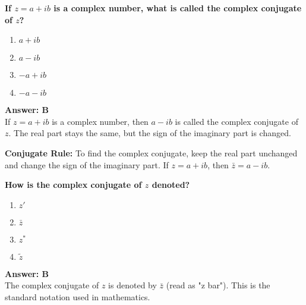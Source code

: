 \documentclass[12pt,a4paper]{article}
\begin{document}
\newpage
\begin{questiontitle}[MCQ 30]
\textbf{If \( z = a + ib \) is a complex number, what is called the complex conjugate of \( z \)?}
\end{questiontitle}

\begin{partbox}[Options]
\begin{enumerate}[label=\Alph*.]
    \item \( a + ib \)
    \item \( a - ib \)
    \item \( -a + ib \)
    \item \( -a - ib \)
\end{enumerate}
\end{partbox}

\begin{answerstyle}
\textbf{Answer: B} \\
If \( z = a + ib \) is a complex number, then \( a - ib \) is called the complex conjugate of \( z \). The real part stays the same, but the sign of the imaginary part is changed.
\end{answerstyle}

\begin{conceptbox}
\textbf{Conjugate Rule:} To find the complex conjugate, keep the real part unchanged and change the sign of the imaginary part. If \( z = a + ib \), then \( \bar{z} = a - ib \).
\end{conceptbox}

\newpage
\begin{questiontitle}[MCQ 31]
\textbf{How is the complex conjugate of \( z \) denoted?}
\end{questiontitle}

\begin{partbox}[Options]
\begin{enumerate}[label=\Alph*.]
    \item \( z' \)
    \item \( \bar{z} \)
    \item \( z^* \)
    \item \( \tilde{z} \)
\end{enumerate}
\end{partbox}

\begin{answerstyle}
\textbf{Answer: B} \\
The complex conjugate of \( z \) is denoted by \( \bar{z} \) (read as "z bar"). This is the standard notation used in mathematics.
\end{answerstyle}
\end{document}
